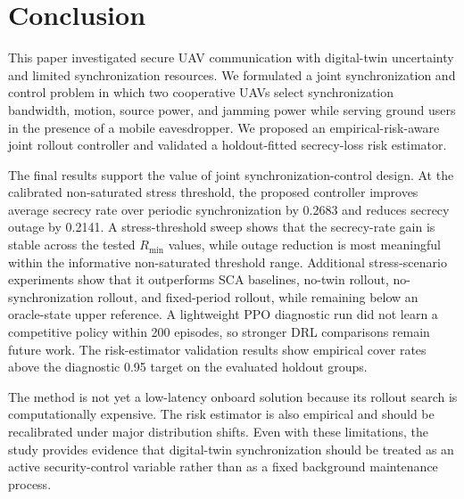 \section{Conclusion}
\label{sec:conclusion}

This paper investigated secure UAV communication with digital-twin uncertainty and limited synchronization resources. We formulated a joint synchronization and control problem in which two cooperative UAVs select synchronization bandwidth, motion, source power, and jamming power while serving ground users in the presence of a mobile eavesdropper. We proposed an empirical-risk-aware joint rollout controller and validated a holdout-fitted secrecy-loss risk estimator.

The final results support the value of joint synchronization-control design. At the calibrated non-saturated stress threshold, the proposed controller improves average secrecy rate over periodic synchronization by 0.2683 and reduces secrecy outage by 0.2141. A stress-threshold sweep shows that the secrecy-rate gain is stable across the tested $R_{\min}$ values, while outage reduction is most meaningful within the informative non-saturated threshold range. Additional stress-scenario experiments show that it outperforms SCA baselines, no-twin rollout, no-synchronization rollout, and fixed-period rollout, while remaining below an oracle-state upper reference. A lightweight PPO diagnostic run did not learn a competitive policy within 200 episodes, so stronger DRL comparisons remain future work. The risk-estimator validation results show empirical cover rates above the diagnostic 0.95 target on the evaluated holdout groups.

The method is not yet a low-latency onboard solution because its rollout search is computationally expensive. The risk estimator is also empirical and should be recalibrated under major distribution shifts. Even with these limitations, the study provides evidence that digital-twin synchronization should be treated as an active security-control variable rather than as a fixed background maintenance process.
